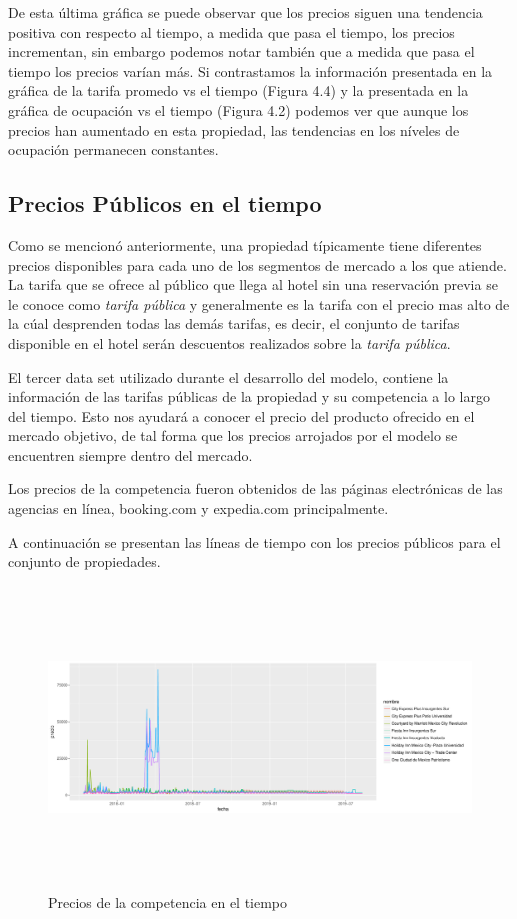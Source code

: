 De esta última gráfica se puede observar que los precios siguen una tendencia positiva con respecto al tiempo, a medida que pasa el tiempo, los precios incrementan, sin embargo podemos notar también que a medida que pasa el tiempo los precios varían más. Si contrastamos la información presentada en la gráfica de la tarifa promedo vs el tiempo (Figura 4.4) y la presentada en la gráfica de ocupación vs el tiempo (Figura 4.2) podemos ver que aunque los precios han aumentado en esta propiedad, las tendencias en los níveles de ocupación permanecen constantes.

\subsection*{Precios Públicos en el tiempo}

Como se mencionó anteriormente, una propiedad típicamente tiene diferentes precios disponibles para cada uno de los segmentos de mercado a los que atiende. La tarifa que se ofrece al público que llega al hotel sin una reservación previa se le conoce como \emph{tarifa pública} y generalmente es la tarifa con el precio mas alto de la cúal desprenden todas las demás tarifas, es decir, el conjunto de tarifas disponible en el hotel serán descuentos realizados sobre la \emph{tarifa pública}.

El tercer data set utilizado durante el desarrollo del modelo, contiene la información de las tarifas públicas de la propiedad y su competencia a lo largo del tiempo. Esto nos ayudará a conocer el precio del producto ofrecido en el mercado objetivo, de tal forma que los precios arrojados por el modelo se encuentren siempre dentro del mercado.

Los precios de la competencia fueron obtenidos de las páginas electrónicas de las agencias en línea, booking.com y expedia.com principalmente.

A continuación se presentan las líneas de tiempo con los precios públicos para el conjunto de propiedades.

\begin{figure}[H]
  \centering
      \includegraphics[width=\maxwidth,height=8cm]{figures/PreciosGraf-1}    
  \caption{Precios de la competencia en el tiempo}
\end{figure}



